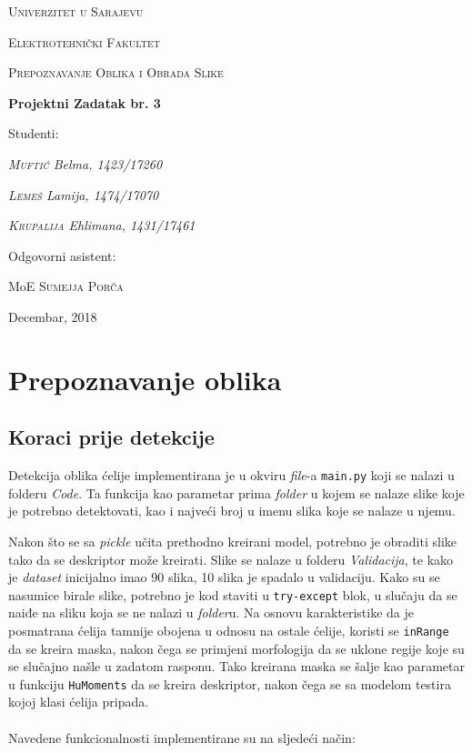 \documentclass[12pt,a4paper]{article}
\begin{document}
\begin{titlepage}
	\centering
	{\scshape Univerzitet u Sarajevu \par}
	{\scshape Elektrotehnički Fakultet \par}
	\vspace{1cm}
	{\Large\scshape Prepoznavanje Oblika i Obrada Slike\par}
	\vspace{1.5cm}
	{\huge\bfseries Projektni Zadatak br. 3\par}
	\vspace{2cm}
	\Large Studenti: \par
	{\Large\itshape \textsc{Muftić} Belma, 1423/17260\par}
	{\Large\itshape \textsc{Lemeš} Lamija, 1474/17070\par}
	{\Large\itshape \textsc{Krupalija} Ehlimana, 1431/17461\par}
	\vfill
	Odgovorni asistent:\par
	MoE \textsc{Sumejja Porča}
	\vfill
	{\large Decembar, 2018\par}
\end{titlepage}


\tableofcontents

\newpage

\setcounter{page}{1}

\section{Prepoznavanje oblika}

\subsection{Koraci prije detekcije}

Detekcija oblika ćelije implementirana je u okviru \textit{file}-a \texttt{main.py} koji se nalazi u folderu \textit{Code}. Ta funkcija kao parametar prima \textit{folder} u kojem se nalaze slike koje je potrebno detektovati, kao i najveći broj u imenu slika koje se nalaze u njemu.

Nakon što se sa \textit{pickle} učita prethodno kreirani model, potrebno je obraditi slike tako da se deskriptor može kreirati. Slike se nalaze u folderu \textit{Validacija}, te kako je \textit{dataset} inicijalno imao 90 slika, 10 slika je spadalo u validaciju. Kako su se nasumice birale slike, potrebno je kod staviti u \texttt{try-except} blok, u slučaju da se naiđe na sliku koja se ne nalazi u \textit{folder}u. Na osnovu karakteristike da je posmatrana ćelija tamnije obojena u odnosu na ostale ćelije, koristi se \texttt{inRange} da se kreira maska, nakon čega se primjeni morfologija da se uklone regije koje su se slučajno našle u zadatom rasponu. Tako kreirana maska se šalje kao parametar u funkciju \texttt{HuMoments} da se kreira deskriptor, nakon čega se sa modelom testira kojoj klasi ćelija pripada.\\
~\\
Navedene funkcionalnosti implementirane su na sljedeći način:\\
\end{document}
